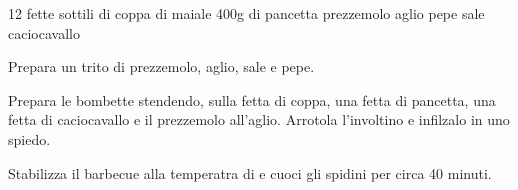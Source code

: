 \begin{ingreds}
	12 fette sottili di coppa di maiale
	400g di pancetta
	prezzemolo
	aglio
	pepe
	sale
	caciocavallo

\end{ingreds}

\begin{method}
Prepara un trito di prezzemolo, aglio, sale e pepe.

Prepara le bombette stendendo, sulla fetta di coppa, una fetta di pancetta, una fetta di caciocavallo e il prezzemolo all'aglio. Arrotola l'involtino e infilzalo in uno spiedo.

Stabilizza il barbecue alla temperatra di  e cuoci gli spidini per circa 40 minuti.
\end {method}

